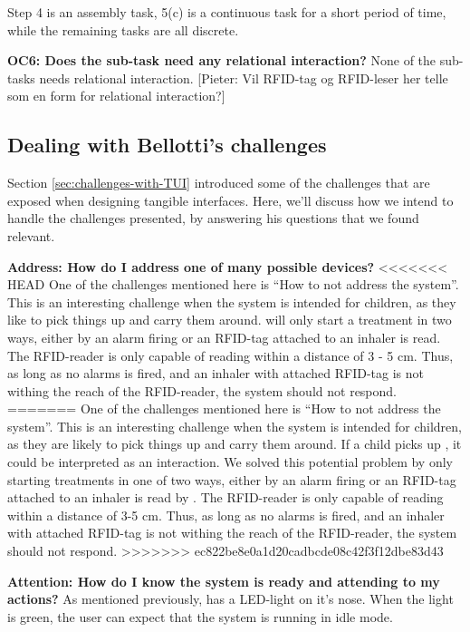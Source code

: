 Step 4 is an assembly task, 5(c) is a continuous task for a short period of time, while the remaining tasks are all discrete.  

\textbf{OC6: Does the sub-task need any relational interaction?}
None of the sub-tasks needs relational interaction.
[Pieter: Vil RFID-tag og RFID-leser her telle som en form for relational interaction?]
 
\subsection{Dealing with Bellotti's challenges}

Section \ref{sec:challenges-with-TUI} introduced some of the challenges that are exposed when designing tangible interfaces. Here, we'll discuss how we intend to handle the challenges presented, by answering his questions that we found relevant. 

\textbf{Address: How do I address one of many possible devices?}
<<<<<<< HEAD
One of the challenges mentioned here is ``How to not address the system''. This is an interesting challenge when the system is intended for children, as they like to pick things up and carry them around. \buddy{} will only start a treatment in two ways, either by an alarm firing or an RFID-tag attached to an inhaler is read. The RFID-reader is only capable of reading within a distance of 3 - 5 cm. Thus, as long as no alarms is fired, and an inhaler with attached RFID-tag is not withing the reach of the RFID-reader, the system should not respond.  
=======
One of the challenges mentioned here is ``How to not address the system''. This is an interesting challenge when the system is intended for children, as they are likely to pick things up and carry them around. If a child picks up \ab{}, it could be interpreted as an interaction. We solved this potential problem by only starting treatments in one of two ways, either by an alarm firing or an RFID-tag attached to an inhaler is read by \ab{}. The RFID-reader is only capable of reading within a distance of 3-5 cm. Thus, as long as no alarms is fired, and an inhaler with attached RFID-tag is not withing the reach of the RFID-reader, the system should not respond.  
>>>>>>> ec822be8e0a1d20cadbcde08c42f3f12dbe83d43

\textbf{Attention: How do I know the system is ready and attending to my actions?}
As mentioned previously, \buddy{} has a LED-light on it's nose. When the light is green, the user can expect that the system is running in idle mode. 

